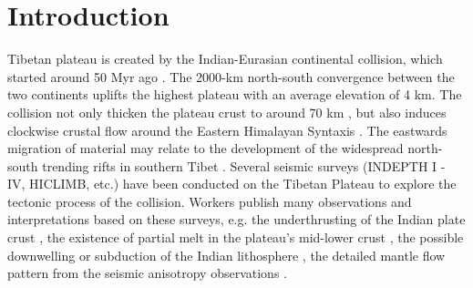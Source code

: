 \section{Introduction}

Tibetan plateau is created by the Indian-Eurasian continental collision, which started around 50 Myr ago \cite{Patriat_1984}. The 2000-km north-south convergence between the two continents uplifts the highest plateau with an average elevation of 4 km. The collision not only thicken the plateau crust to around 70 km \cite[e.g.][]{Nabelek_2009}, but also induces clockwise crustal flow around the Eastern Himalayan Syntaxis \cite{Gan_2007}. The eastwards migration of material may relate to the development of the widespread north-south trending rifts in southern Tibet \cite[e.g.][]{Yin_2000,Zhang_2013}. 
Several seismic surveys (INDEPTH I - IV, HICLIMB, etc.) have been conducted on the Tibetan Plateau to explore the tectonic process of the collision. Workers publish many observations and interpretations based on these surveys, e.g. the underthrusting of the Indian plate crust \cite{Zhao_1993}, the existence of partial melt in the plateau’s mid-lower crust \cite{Brown_1996}, the possible downwelling or subduction of the Indian lithosphere \cite{Tilmann_2003,Li_2008}, the detailed mantle flow pattern from the seismic anisotropy observations \cite[e.g.][]{Hirn_1995,Huang_2000,Fu_2008}.


